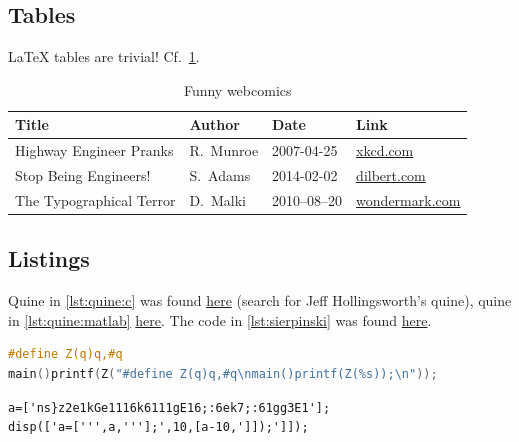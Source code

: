 
\listoftodos


\subsection{Tables}
\LaTeX{} tables are trivial! Cf.\ \cref{tab:example}.

\begin{table}
  \centering
  \caption{Funny webcomics}
  \label{tab:example}
  \begin{tabular}{llll}
    \hline
    Title                    & Author     & Date         & Link                                                    \\
    \hline
    Highway Engineer Pranks  & R.\ Munroe & 2007-04-25   & \href{http://xkcd.com/253/}{xkcd.com}                   \\
    Stop Being Engineers!    & S.\ Adams  & 2014-02-02   & \href{http://dilbert.com/strip/2014-02-02}{dilbert.com} \\
    The Typographical Terror & D.\ Malki  & 2010--08--20 & \href{http://wondermark.com/650/}{wondermark.com}       \\
    \hline
  \end{tabular}
\end{table}


\subsection{Listings}
Quine in \cref{lst:quine:c} was found \href{https://www.nyx.net/~gthompso/self_c.txt}{here} (search for Jeff Hollingsworth's quine),
quine in \cref{lst:quine:matlab} \href{http://blog.garritys.org/2009/10/quines.html}{here}. The code in
\cref{lst:sierpinski} was found \href{http://rosettacode.org/wiki/Sierpinski_carpet#Python}{here}.

\begin{lstlisting}[language = C, label = lst:quine:c, caption = {An elegant C quine}]
#define Z(q)q,#q
main()printf(Z("#define Z(q)q,#q\nmain()printf(Z(%s));\n"));
\end{lstlisting}

\begin{lstlisting}[label = lst:quine:matlab, caption = {An elegant MATLAB quine}]
a=['ns}z2e1kGe1116k6111gE16;:6ek7;:61gg3E1'];
disp(['a=[''',a,'''];',10,[a-10,']]);']]);
\end{lstlisting}

